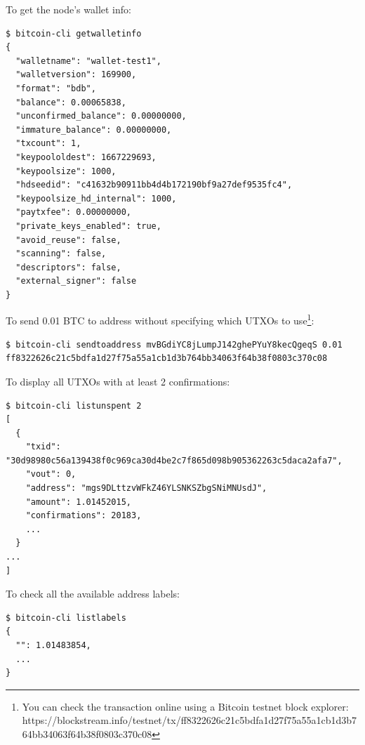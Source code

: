 \noindent To get the node's wallet info:
\begin{emphbox}
\begin{lstlisting}[style=Bash]
$ bitcoin-cli getwalletinfo
{
  "walletname": "wallet-test1",
  "walletversion": 169900,
  "format": "bdb",
  "balance": 0.00065838,
  "unconfirmed_balance": 0.00000000,
  "immature_balance": 0.00000000,
  "txcount": 1,
  "keypoololdest": 1667229693,
  "keypoolsize": 1000,
  "hdseedid": "c41632b90911bb4d4b172190bf9a27def9535fc4",
  "keypoolsize_hd_internal": 1000,
  "paytxfee": 0.00000000,
  "private_keys_enabled": true,
  "avoid_reuse": false,
  "scanning": false,
  "descriptors": false,
  "external_signer": false
}
\end{lstlisting}
\end{emphbox}
\vspace{1em}


\noindent To send 0.01 BTC to address  without specifying which UTXOs to use\footnote{You can check the transaction online using a Bitcoin testnet block explorer: https://blockstream.info/testnet/tx/ff8322626c21c5bdfa1d27f75a55a1cb1d3b764bb34063f64b38f0803c370c08}:
\begin{emphbox}
\begin{lstlisting}[style=Bash]
$ bitcoin-cli sendtoaddress mvBGdiYC8jLumpJ142ghePYuY8kecQgeqS 0.01
ff8322626c21c5bdfa1d27f75a55a1cb1d3b764bb34063f64b38f0803c370c08
\end{lstlisting}
\end{emphbox}
\vspace{1em}

\noindent To display all UTXOs with at least 2 confirmations:
\begin{emphbox}
\begin{lstlisting}[style=Bash]
$ bitcoin-cli listunspent 2
[
  {
    "txid": "30d98980c56a139438f0c969ca30d4be2c7f865d098b905362263c5daca2afa7",
    "vout": 0,
    "address": "mgs9DLttzvWFkZ46YLSNKSZbgSNiMNUsdJ",
    "amount": 1.01452015,
    "confirmations": 20183,
    ...
  }
... 
]
\end{lstlisting}
\end{emphbox}
\vspace{1em}

\noindent To check all the available address labels:
\begin{emphbox}
\begin{lstlisting}[style=Bash]
$ bitcoin-cli listlabels
{
  "": 1.01483854,
  ...
}
\end{lstlisting}
\end{emphbox}
\vspace{1em}

